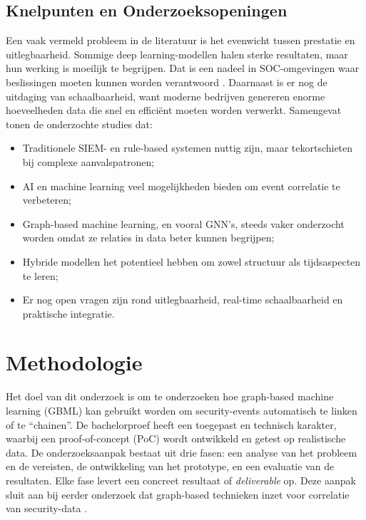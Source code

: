 \subsection{Knelpunten en \newline Onderzoeksopeningen}
Een vaak vermeld probleem in de literatuur is het evenwicht tussen prestatie en uitlegbaarheid. Sommige deep learning-modellen halen sterke resultaten, maar hun werking is moeilijk te \newline begrijpen. Dat is een nadeel in SOC-omgevingen waar beslissingen moeten kunnen worden verantwoord \autocite{Gamage2025}.  
Daarnaast is er nog de uitdaging van schaalbaarheid, want moderne bedrijven genereren enorme hoeveelheden data die snel en efficiënt moeten worden verwerkt.
\newline
\newline
Samengevat tonen de onderzochte studies dat:
\begin{itemize}
    \item Traditionele SIEM- en rule-based systemen nuttig zijn, maar tekortschieten bij complexe aanvalspatronen;
    \item AI en machine learning veel mogelijkheden bieden om event correlatie te verbeteren;
    \item Graph-based machine learning, en vooral \newline GNN’s, steeds vaker onderzocht worden omdat ze relaties in data beter kunnen begrijpen;
    \item Hybride modellen het potentieel hebben om zowel structuur als tijdsaspecten te leren;
    \item Er nog open vragen zijn rond uitlegbaarheid, real-time schaalbaarheid en praktische integratie.
\end{itemize}


\section{Methodologie}
\label{sec:methodologie}

Het doel van dit onderzoek is om te onderzoeken hoe graph-based machine learning (GBML) kan gebruikt worden om security-events automatisch te linken of te “chainen”.  
De bachelorproef heeft een toegepast en technisch karakter, waarbij een proof-of-concept (PoC) wordt ontwikkeld en getest op realistische data.  
De onderzoeksaanpak bestaat uit drie fasen: een analyse van het probleem en de vereisten, de ontwikkeling van het prototype, en een evaluatie van de resultaten.  
\newline
\newline
Elke fase levert een concreet resultaat of \emph{deliverable} op. Deze aanpak sluit aan bij eerder onderzoek dat graph-based technieken inzet voor correlatie van security-data \autocite{Kanka2022, Brooks2025, Vitulyova2025}.
\newline
\newline

